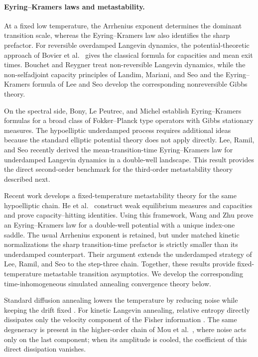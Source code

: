 \documentclass[11pt]{article}
\theoremstyle{definition}
\begin{document}
\paragraph{Eyring--Kramers laws and metastability.}
At a fixed low temperature, the Arrhenius exponent determines the dominant
transition scale, whereas the Eyring--Kramers law also identifies the sharp
prefactor. For reversible overdamped Langevin dynamics, the potential-theoretic
approach of Bovier et al.\ \cite{BovierEtAl2004} gives the classical formula
for capacities and mean exit times. Bouchet and Reygner
\cite{BouchetReygner2016} treat non-reversible Langevin dynamics, while the
non-selfadjoint capacity principles of Landim, Mariani, and Seo
\cite{LandimMarianiSeo2019} and the Eyring--Kramers formula of Lee and Seo
\cite{LeeSeo2022} develop the corresponding nonreversible Gibbs theory.

On the
spectral side, Bony, Le Peutrec, and Michel \cite{BonyLePeutrecMichel2025}
establish Eyring--Kramers formulas for a broad class of Fokker--Planck type
operators with Gibbs stationary measures.
The hypoelliptic underdamped process requires additional ideas because the
standard elliptic potential theory does not apply directly. Lee, Ramil, and Seo
\cite{LeeRamilSeo2026} recently derived the mean-transition-time
Eyring--Kramers law for underdamped Langevin dynamics in a double-well
landscape. This result provides the direct second-order benchmark for the
third-order metastability theory described next.

Recent work develops a fixed-temperature metastability theory for the same
hypoelliptic chain. He et al.\ \cite{HeLiWangZhu2026} construct weak
equilibrium measures and capacities and prove capacity--hitting identities. Using
this framework, Wang and Zhu \cite{WangZhu2026} prove an Eyring--Kramers law for a
double-well potential with a unique index-one saddle. The usual Arrhenius exponent
is retained, but under matched kinetic normalizations the sharp transition-time
prefactor is strictly smaller than its underdamped counterpart. Their argument
extends the underdamped strategy of Lee, Ramil, and Seo \cite{LeeRamilSeo2026} to the step-three chain.
Together, these results provide fixed-temperature metastable transition
asymptotics. We develop the
corresponding time-inhomogeneous simulated annealing convergence theory below.

Standard diffusion annealing lowers the temperature by reducing noise while keeping
the drift fixed \cite{GemanHwang1986,ChiangHwangSheu1987,Royer1989}. For kinetic
Langevin annealing, relative entropy directly dissipates only the velocity component
of the Fisher information \cite[Section~2.2]{HeTanWu2024}. The same degeneracy is
present in the higher-order chain of Mou et al.\ \cite{MouEtAl2021}, where noise acts
only on the last component; when its amplitude is cooled, the coefficient of this
direct dissipation vanishes.
\end{document}
